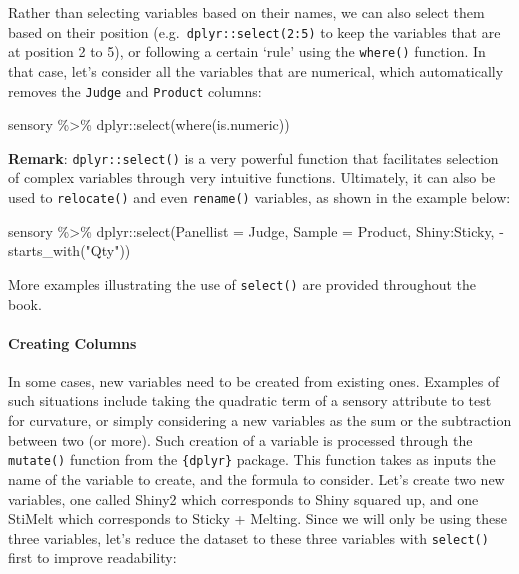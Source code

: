 \documentclass[
]{book}
\newenvironment{Shaded}{\begin{snugshade}}{\end{snugshade}}
\newcommand{\AttributeTok}[1]{\textcolor[rgb]{0.77,0.63,0.00}{#1}}
\newcommand{\FunctionTok}[1]{\textcolor[rgb]{0.00,0.00,0.00}{#1}}
\newcommand{\NormalTok}[1]{#1}
\newcommand{\SpecialCharTok}[1]{\textcolor[rgb]{0.00,0.00,0.00}{#1}}
\newcommand{\StringTok}[1]{\textcolor[rgb]{0.31,0.60,0.02}{#1}}
\begin{document}
Rather than selecting variables based on their names, we can also select them based on their position (e.g.~\texttt{dplyr::select(2:5)} to keep the variables that are at position 2 to 5), or following a certain `rule' using the \texttt{where()} function. In that case, let's consider all the variables that are numerical, which automatically removes the \texttt{Judge} and \texttt{Product} columns:

\begin{Shaded}
\begin{Highlighting}[]
\NormalTok{sensory }\SpecialCharTok{\%\textgreater{}\%} 
\NormalTok{  dplyr}\SpecialCharTok{::}\FunctionTok{select}\NormalTok{(}\FunctionTok{where}\NormalTok{(is.numeric))}
\end{Highlighting}
\end{Shaded}

\textbf{Remark}: \texttt{dplyr::select()} is a very powerful function that facilitates selection of complex variables through very intuitive functions. Ultimately, it can also be used to \texttt{relocate()} and even \texttt{rename()} variables, as shown in the example below:

\begin{Shaded}
\begin{Highlighting}[]
\NormalTok{sensory }\SpecialCharTok{\%\textgreater{}\%} 
\NormalTok{  dplyr}\SpecialCharTok{::}\FunctionTok{select}\NormalTok{(}\AttributeTok{Panellist =}\NormalTok{ Judge, }\AttributeTok{Sample =}\NormalTok{ Product, Shiny}\SpecialCharTok{:}\NormalTok{Sticky, }\SpecialCharTok{{-}}\FunctionTok{starts\_with}\NormalTok{(}\StringTok{"Qty"}\NormalTok{))}
\end{Highlighting}
\end{Shaded}

More examples illustrating the use of \texttt{select()} are provided throughout the book.

\hypertarget{creating-columns}{%
\paragraph{Creating Columns}\label{creating-columns}}

In some cases, new variables need to be created from existing ones. Examples of such situations include taking the quadratic term of a sensory attribute to test for curvature, or simply considering a new variables as the sum or the subtraction between two (or more). Such creation of a variable is processed through the \texttt{mutate()} function from the \texttt{\{dplyr\}} package. This function takes as inputs the name of the variable to create, and the formula to consider.
Let's create two new variables, one called Shiny2 which corresponds to Shiny squared up, and one StiMelt which corresponds to Sticky + Melting. Since we will only be using these three variables, let's reduce the dataset to these three variables with \texttt{select()} first to improve readability:
\end{document}
